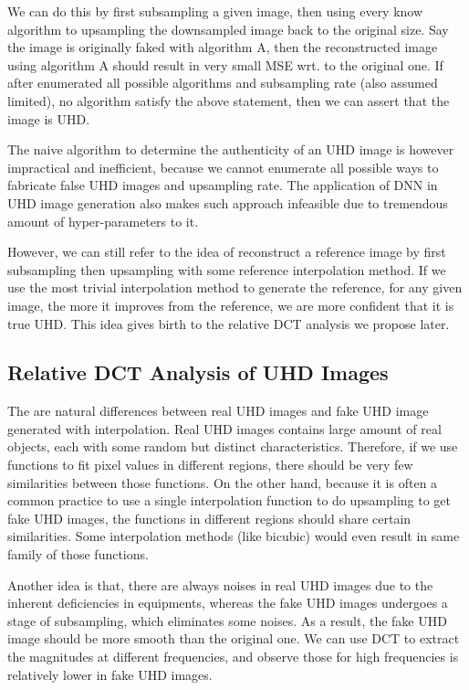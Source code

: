 \documentclass[journal,conference]{IEEEtran}
\begin{document}
We can do this by first subsampling a given image, then using every know algorithm to upsampling the downsampled image back to the original size.
Say the image is originally faked with algorithm A, then the reconstructed image using algorithm A should result in very small MSE wrt. to the original one.
If after enumerated all possible algorithms and subsampling rate (also assumed limited), no algorithm satisfy the above statement, then we can assert that the image is UHD.

The naive algorithm to determine the authenticity of an UHD image is however impractical and inefficient, because we cannot enumerate all possible ways to fabricate false UHD images and upsampling rate.
The application of DNN in UHD image generation also makes such approach infeasible due to tremendous amount of hyper-parameters to it.

However, we can still refer to the idea of reconstruct a reference image by first subsampling then upsampling with some reference interpolation method.
If we use the most trivial interpolation method to generate the reference, for any given image, the more it improves from the reference, we are more confident that it is true UHD.
This idea gives birth to the relative DCT analysis we propose later.

\subsection{Relative DCT Analysis of UHD Images}
The are natural differences between real UHD images and fake UHD image generated with interpolation.
Real UHD images contains large amount of real objects, each with some random but distinct characteristics.
Therefore, if we use functions to fit pixel values in different regions, there should be very few similarities between those functions.
On the other hand, because it is often a common practice to use a single interpolation function to do upsampling to get fake UHD images, the functions in different regions should share certain similarities.
Some interpolation methods (like bicubic) would even result in same family of those functions.

Another idea is that, there are always noises in real UHD images due to the inherent deficiencies in equipments, whereas the fake UHD images undergoes a stage of subsampling, which eliminates some noises.
As a result, the fake UHD image should be more smooth than the original one.
We can use DCT to extract the magnitudes at different frequencies, and observe those for high frequencies is relatively lower in fake UHD images.
\end{document}
